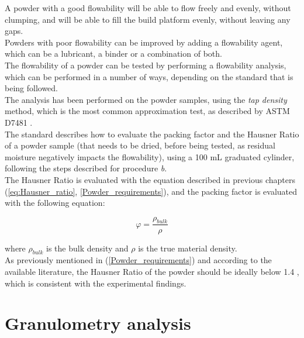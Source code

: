\documentclass{article}
\begin{document}
    A powder with a good flowability will be able to flow freely and evenly, without clumping, and will be able to fill the 
    build platform evenly, without leaving any gaps. \\ 

    Powders with poor flowability can be improved by adding a flowability agent, which can be a lubricant, a binder or a 
    combination of both. \\ 

    The flowability of a powder can be tested by performing a flowability analysis, which can be performed in a number of ways, 
    depending on the standard that is being followed. \\

    The analysis has been performed on the powder samples, using the \textit{tap density} method, which is the most common 
    approximation test, as described by ASTM D7481 \autocites{ASTM_D7481-18}. \\

    The standard describes how to evaluate the packing factor and the Hausner Ratio of a powder sample (that needs to be 
    dried, before being tested, as residual moisture negatively impacts the flowability), 
    using a 100 mL graduated cylinder, following the steps described for procedure \textit{b}. \\

    The Hausner Ratio is evaluated with the equation described in previous chapters (\ref{eq:Hausner_ratio}, \ref{Powder_requirements}), 
    and the packing factor is evaluated with the following equation: 

        \begin{equation}
            \varphi  = \frac{\rho_{bulk}}{\rho}
            \label{eq:packing_factor}
        \end{equation}

    where $\rho_{bulk}$ is the bulk density and $\rho$ is the true material density. \\

    As previously mentioned in (\ref{Powder_requirements}) and according to the available literature, the Hausner Ratio of the powder should 
    be ideally below 1.4 \autocites{doi:10.1063/1.4918516}, which is consistent with the experimental findings. \\  


    \clearpage

    \section{Granulometry analysis\label{granulometry_analysis}}
\end{document}
